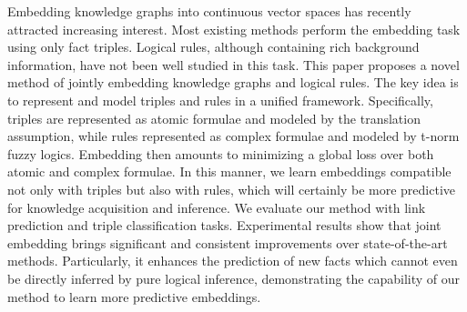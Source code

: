 Embedding knowledge graphs into continuous vector spaces has recently attracted increasing interest. Most existing methods perform the embedding task using only fact triples. Logical rules, although containing rich background information, have not been well studied in this task. This paper proposes a novel method of jointly embedding knowledge graphs and logical rules. The key idea is to represent and model triples and rules in a unified framework. Specifically, triples are represented as atomic formulae and modeled by the translation assumption, while rules represented as complex formulae and modeled by t-norm fuzzy logics. Embedding then amounts to minimizing a global loss over both atomic and complex formulae. In this manner, we learn embeddings compatible not only with triples but also with rules, which will certainly be more predictive for knowledge acquisition and inference. We evaluate our method with link prediction and triple classification tasks. Experimental results show that joint embedding brings significant and consistent improvements over state-of-the-art methods. Particularly, it enhances the prediction of new facts which cannot even be directly inferred by pure logical inference, demonstrating the capability of our method to learn more predictive embeddings.
